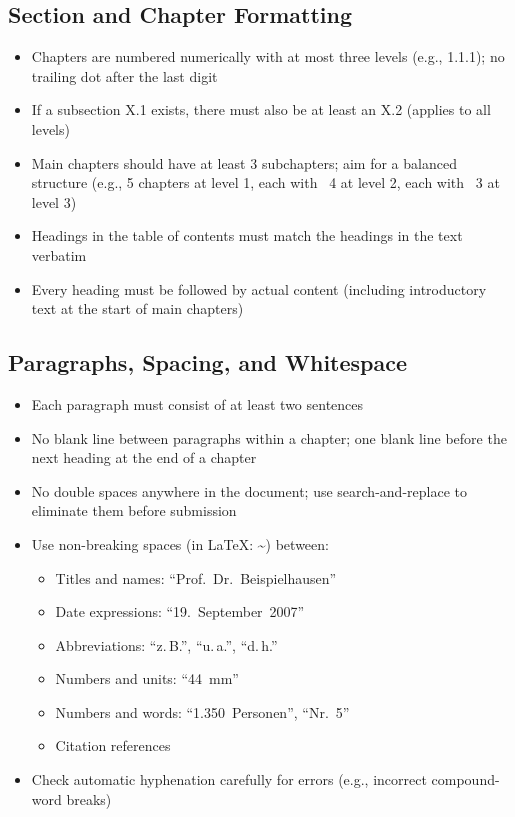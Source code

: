 \subsection{Section and Chapter Formatting}
\begin{itemize}
    \item Chapters are numbered numerically with at most three levels (e.g., 1.1.1); no trailing dot after the last digit
    \item If a subsection X.1 exists, there must also be at least an X.2 (applies to all levels)
    \item Main chapters should have at least 3 subchapters; aim for a balanced structure (e.g., 5 chapters at level 1, each with ~4 at level 2, each with ~3 at level 3)
    \item Headings in the table of contents must match the headings in the text verbatim
    \item Every heading must be followed by actual content (including introductory text at the start of main chapters)
\end{itemize}

\subsection{Paragraphs, Spacing, and Whitespace}
\begin{itemize}
    \item Each paragraph must consist of at least two sentences
    \item No blank line between paragraphs within a chapter; one blank line before the next heading at the end of a chapter
    \item No double spaces anywhere in the document; use search-and-replace to eliminate them before submission
    \item Use non-breaking spaces (in LaTeX: \textasciitilde) between:
    \begin{itemize}
        \item Titles and names: ``Prof.~Dr.~Beispielhausen''
        \item Date expressions: ``19.~September~2007''
        \item Abbreviations: ``z.\,B.'', ``u.\,a.'', ``d.\,h.''
        \item Numbers and units: ``44~mm''
        \item Numbers and words: ``1.350~Personen'', ``Nr.~5''
        \item Citation references
    \end{itemize}
    \item Check automatic hyphenation carefully for errors (e.g., incorrect compound-word breaks)
\end{itemize}

